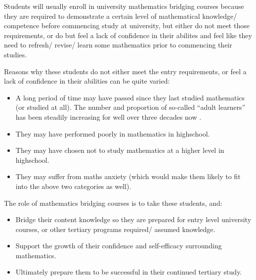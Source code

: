 \documentclass[twoside,12pt,a4paper]{report}
\begin{document}
Students will usually enroll in university mathematics bridging courses because they are required to demonstrate a certain level of mathematical knowledge/ competence before commencing study at university, but either do not meet those requirements, or do but feel a lack of confidence in their abilites and feel like they need to refresh/ revise/ learn some mathematics prior to commencing their studies.

Reasons why these students do not either meet the entry requirements, or feel a lack of confidence in their abilities can be quite varied:
\begin{itemize}
	\item A long period of time may have passed since they last studied mathematics (or studied at all). The number and proportion of so-called ``adult learners'' has been steadily increasing for well over three decades now \cite{Johnson2016, Hardin2008,Murtaugh1999}.
	\item They may have performed poorly in mathematics in highschool.
	\item They may have chosen not to study mathematics at a higher level in highschool.
	\item They may suffer from maths anxiety (which would make them likely to fit into the above two categories as well).
\end{itemize}
	
The role of mathematics bridging courses is to take these students, and:
\begin{itemize}
	\item Bridge their content knowledge so they are prepared for entry level university courses, or other tertiary programs required/ assumed knowledge.
	\item Support the growth of their confidence and self-efficacy surrounding mathematics.
	\item Ultimately prepare them to be successful in their continued tertiary study.
\end{itemize}
\end{document}
